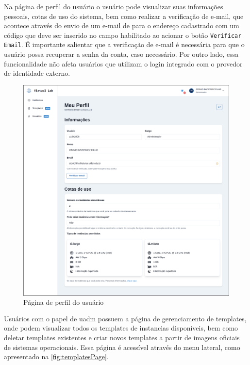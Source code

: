 Na página de perfil do usuário o usuário pode visualizar suas informações pessoais, cotas de uso do sistema, bem como realizar a verificação de e-mail, que acontece através do envio de um e-mail de para o endereço cadastrado com um código que deve ser inserido no campo habilitado ao acionar o botão \texttt{Verificar Email}. É importante salientar que a verificação de e-mail é necessária para que o usuário possa recuperar a senha da conta, caso necessário. Por outro lado, essa funcionalidade não afeta usuários que utilizam o login integrado com o provedor de identidade externo.

\begin{figure}[H]
\caption{Página de perfil do usuário}
\label{fig:userProfile}
\includegraphics[width=\textwidth]{capitulos/3-resultados/files/profile.png}
\end{figure}

Usuários com o papel de \gls{uadm} possuem a página de gerenciamento de templates, onde podem visualizar todos os templates de instancias disponíveis, bem como deletar templates existentes e criar novos templates a partir de imagens oficiais de sistemas operacionais. Essa página é acessível através do menu lateral, como apresentado na \autoref{fig:templatesPage}.

